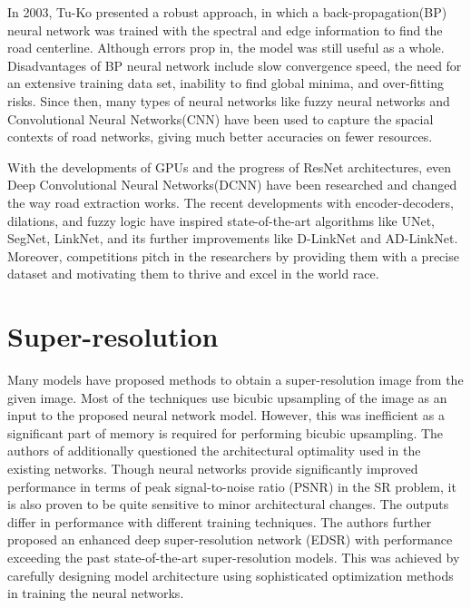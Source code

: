 In 2003, Tu-Ko presented a robust approach, in which a back-propagation(BP) neural network was trained with the spectral and edge information to find the road centerline. Although errors prop in, the model was still useful as a whole. Disadvantages of BP neural network include slow convergence speed, the need for an extensive training data set, inability to find global minima, and over-fitting risks. Since then, many types of neural networks like fuzzy neural networks \cite{mokhtarzade2008automatic} and Convolutional Neural Networks(CNN) have been used to capture the spacial contexts of road networks, giving much better accuracies on fewer resources. \par

With the developments of GPUs and the progress of ResNet architectures, even Deep Convolutional Neural Networks(DCNN) have been researched and changed the way road extraction works. The recent developments with encoder-decoders, dilations, and fuzzy logic have inspired state-of-the-art algorithms like UNet, SegNet, LinkNet, and its further improvements like D-LinkNet and AD-LinkNet. Moreover, competitions pitch in the researchers by providing them with a precise dataset and motivating them to thrive and excel in the world race. \par


\section{Super-resolution}
Many models have proposed methods to obtain a super-resolution image from the given image. Most of the techniques use bicubic upsampling of the image as an input to the proposed neural network model. However, this was inefficient as a significant part of memory is required for performing bicubic upsampling. The authors of %
additionally questioned the architectural optimality used in the existing networks. Though neural networks provide significantly improved performance in terms of peak signal-to-noise ratio (PSNR) in the SR problem, it is also proven to be quite sensitive to minor architectural changes. The outputs differ in performance with different training techniques. The authors further proposed an enhanced deep super-resolution network (EDSR) with performance exceeding the past state-of-the-art super-resolution models. This was achieved by carefully designing model architecture using sophisticated optimization methods in training the neural networks. \par

